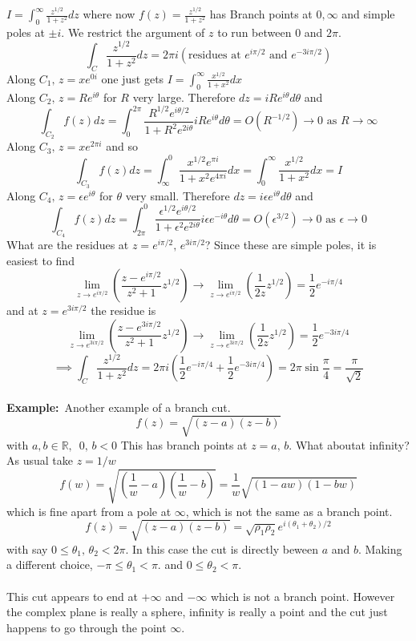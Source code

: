 \documentclass{article}
\newcommand{\example}{\textbf{Example:}}
\begin{document}
$\displaystyle I = \int^{\infty}_0 \frac{z^{1/2}}{1+z^2} dz$ where now
$\displaystyle f(z)= \frac{z^{1/2}}{1+z^2} $ has Branch points at
$0,\infty$ and simple poles at $\pm i$. We restrict the argument of $z$ to
run between $0$ and $2\pi$.
\[ \int_C \frac{z^{1/2}}{1+z^2} dz = 2\pi i \left( \mbox{residues at }
e^{i\pi /2} \mbox{ and } e^{-3i\pi /2} \right) \]
Along $C_1, \, z = x e^{0i}$ one just gets 
$\displaystyle I = \int^{\infty}_0 \frac{x^{1/2}}{1+x^2} dx$\\
Along $C_2, \, z = R e^{i\theta}$ for $R$ very large. Therefore
$dz = iR e^{i\theta} d\theta$ and
\[ \int_{C_2} f(z) dz = \int_0^{2\pi} \frac{R^{1/2} e^{i\theta/2}}{1 + R^2 e^{2i\theta}} 
i R e^{i\theta} d\theta = O(R^{-1/2}) \to 0 \mbox{ as } R \to \infty \]
Along $C_3, \, z = x e^{2\pi i}$  and so 
\[ \int_{C_3} f(z) dz = \int_{\infty}^0 \frac{x^{1/2} e^{\pi i} }{1+ x^2 e^{4\pi i}} dx
= \int_0^{\infty} \frac{x^{1/2}}{1+x^2} dx = I \]
Along $C_4, \, z = \epsilon e^{i\theta}$ for $\theta$ very small. Therefore
$dz = i\epsilon e^{i\theta} d\theta$ and
\[ \int_{C_4} f(z) dz = \int_{2\pi}^0 \frac{\epsilon^{1/2} e^{i\theta/2}}
{1 + \epsilon^2 e^{2i\theta}} i \epsilon e^{-i\theta} d\theta = O(\epsilon^{3/2})
\to 0 \mbox{ as } \epsilon \to 0 \]
What are the residues at $z = e^{i \pi /2}, \, e^{3 i \pi /2} $?
Since these are simple poles, it is easiest to find
\[ \lim_{z \to e^{i\pi/2}} \left( \frac{z - e^{i\pi /2}}{z^2 + 1} z^{1/2} 
\right) \to  \lim_{z \to e^{i\pi/2}} \left( \frac{1}{2z} z^{1/2} \right)
= \frac{1}{2} e^{-i\pi /4} \]
and at $z = e^{3i \pi /2}$ the residue is 
\[ \lim_{z \to e^{3i\pi/2}} \left( \frac{z - e^{3i\pi /2}}{z^2 + 1} z^{1/2} 
\right) \to  \lim_{z \to e^{3i\pi/2}} \left( \frac{1}{2z} z^{1/2} \right)
= \frac{1}{2} e^{-3i\pi /4} \]
\[ \implies \int_C \frac{z^{1/2}}{1+z^2} dz = 2\pi i \left(
\frac{1}{2} e^{-i \pi /4} + \frac{1}{2} e^{-3i\pi /4} \right) =
2\pi \sin \frac{\pi}{4} = \frac{\pi}{\sqrt{2}} \]
\\
\example\ Another example of a branch cut.
\[f(z) = \sqrt{(z-a)(z-b)}\]
with $a,b \in \mathbb{R}, \; \>0,\, b<0$ This has branch points at $z= a, \, b$.
What aboutat infinity? As usual take $z = 1/w$
\[f(w) = \sqrt{\left(\frac{1}{w} - a\right)\left(\frac{1}{w} -b\right)} 
= \frac{1}{w} \sqrt{(1-aw)(1-bw)}\]
which is fine apart from a pole at $\infty$, which is not the same as a branch 
point. 
\[f(z) = \sqrt{(z-a)(z-b)} = \sqrt{\rho_1 \rho_2}e^{i(\theta_1+\theta_2)/2}\]
with say $0 \leq \theta_1 , \, \theta_2 < 2\pi$. In this case the cut is 
directly beween $a$ and $b$. Making a different choice, $-\pi \leq \theta_1 < \pi$.
and $0 \leq \theta_2 < \pi$.
\\
\\
This cut appears to end at $+\infty$ and $-\infty$ which is not a branch point.
However the complex plane is really a sphere, infinity is really a point and 
the cut just happens to go through the point $\infty$.
\end{document}
